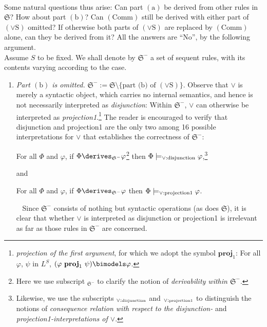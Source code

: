 \begin{enumerate}[1.]
\\
Some natural questions thus arise: Can part $(\mathrm{a})$ be derived from other rules in $\mathfrak{S}$? How about part $(\mathrm{b})$? Can $(\mathrm{Comm})$ still be derived with either part of $(\lor\mathrm{S})$ omitted? If otherwise both parts of $(\lor\mathrm{S})$ are replaced by $(\mathrm{Comm})$ alone, can they be derived from it? All the answers are ``No'', by the following argument.\newline
\\
Assume $S$ to be fixed. We shall denote by $\mathfrak{S}^-$ a set of sequent rules, with its contents varying according to the case.
\begin{enumerate}[(1)]
\item \emph{Part $(\mathrm{b})$ is omitted.} \begin{math}\mathfrak{S}^- := \mathfrak{S} \setminus \{\mbox{part (b) of $(\lor\mathrm{S})$}\}\end{math}. Observe that $\lor$ is merely a syntactic object, which carries no internal semantics, and hence is not necessarily interpreted as \emph{disjunction}: Within $\mathfrak{S}^-$, $\lor$ can otherwise be interpreted as \emph{projection1}.\footnote{\emph{projection of the first argument}, for which we adopt the symbol $\mathbf{proj}_1$: For all $\varphi$, $\psi$ in $L^S$, $(\varphi \ \mathbf{proj}_1 \ \psi) \bimodels \varphi$.} The reader is encouraged to verify that disjunction and projection1 are the only two among 16 possible interpretations for $\lor$ that establishes the correctness of $\mathfrak{S}^-$:
\begin{center}
For all $\Phi$ and $\varphi$, if $\Phi \derives_{\mathfrak{S}^-} \varphi$\footnote{Here we use subscript $_{\mathfrak{S}^-}$ to clarify the notion of \emph{derivability within $\mathfrak{S}^-$}.} then $\Phi \models_{\lor : \mbox{\scriptsize disjunction}} \varphi$,\footnote{Likewise, we use the subscripts $_{\lor : \mbox{\tiny disjunction}}$ and $_{\lor : \mbox{\tiny projection1}}$ to distinguish the notions of \emph{consequence relation with respect to the disjunction-} and \emph{projection1-interpretations of $\lor$}.}
\end{center}
and
\begin{center}
For all $\Phi$ and $\varphi$, if $\Phi \derives_{\mathfrak{S}^-} \varphi$ then $\Phi \models_{\lor : \mbox{\scriptsize projection1}} \varphi$.
\end{center}
\ \newline
Since $\mathfrak{S}^-$ consists of nothing but syntactic operations (as does $\mathfrak{S}$), it is clear that whether $\lor$ is interpreted as disjunction or projection1 is irrelevant as far as those rules in $\mathfrak{S}^-$ are concerned.\newline

\end{enumerate}
\end{enumerate}
